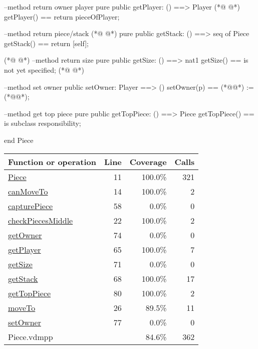 \begin{vdmpp}[breaklines=true]
  --method return owner player
  pure public getPlayer: () ==> Player
(*@
\label{getSize:71}
@*)
  getPlayer() == return pieceOfPlayer;
  
  --method return piece/stack
(*@
\label{getOwner:74}
@*)
  pure public getStack: () ==> seq of Piece
  getStack() == return [self];
  
(*@
\label{setOwner:77}
@*)
  --method return size
  pure public getSize: () ==> nat1
  getSize() == is not yet specified;
(*@
\label{getTopPiece:80}
@*)

  --method set owner  
  public setOwner: Player ==> ()
  setOwner(p) == (*@@*) := (*@@*);
  
  --method get top piece
  pure public getTopPiece: () ==> Piece
  getTopPiece() == is subclass responsibility;
 
end Piece
\end{vdmpp}
\bigskip
\begin{longtable}{|l|r|r|r|}
\hline
Function or operation & Line & Coverage & Calls \\
\hline
\hline
\hyperref[Piece:11]{Piece} & 11&100.0\% & 321 \\
\hline
\hyperref[canMoveTo:14]{canMoveTo} & 14&100.0\% & 2 \\
\hline
\hyperref[capturePiece:58]{capturePiece} & 58&0.0\% & 0 \\
\hline
\hyperref[checkPiecesMiddle:22]{checkPiecesMiddle} & 22&100.0\% & 2 \\
\hline
\hyperref[getOwner:74]{getOwner} & 74&0.0\% & 0 \\
\hline
\hyperref[getPlayer:65]{getPlayer} & 65&100.0\% & 7 \\
\hline
\hyperref[getSize:71]{getSize} & 71&0.0\% & 0 \\
\hline
\hyperref[getStack:68]{getStack} & 68&100.0\% & 17 \\
\hline
\hyperref[getTopPiece:80]{getTopPiece} & 80&100.0\% & 2 \\
\hline
\hyperref[moveTo:26]{moveTo} & 26&89.5\% & 11 \\
\hline
\hyperref[setOwner:77]{setOwner} & 77&0.0\% & 0 \\
\hline
\hline
Piece.vdmpp & & 84.6\% & 362 \\
\hline
\end{longtable}

